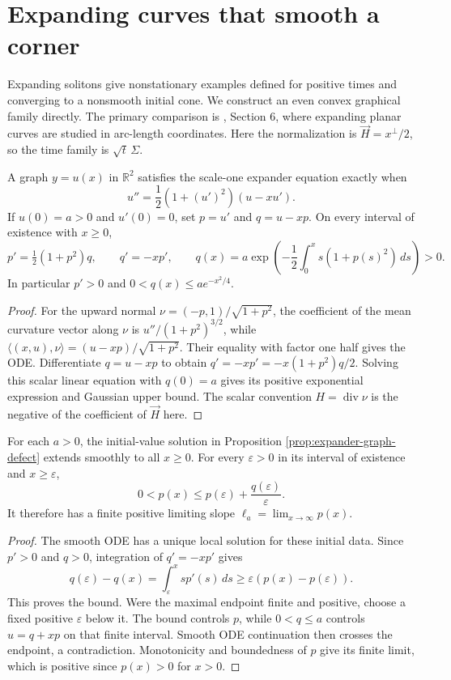 \chapter{Expanding curves that smooth a corner}\label{sec:examples-expanders}
Expanding solitons give nonstationary examples defined for positive times and converging to a nonsmooth initial cone. We construct an even convex graphical family directly. The primary comparison is \cite{Hal12}, Section 6, where expanding planar curves are studied in arc-length coordinates. Here the normalization is $\vec H=x^\perp/2$, so the time family is $\sqrt t\,\Sigma$.

\begin{proposition}\label{prop:expander-graph-defect}
A graph $y=u(x)$ in $\mathbb R^2$ satisfies the scale-one expander equation exactly when
\[
 u''=\frac12(1+(u')^2)(u-xu').
\]
If $u(0)=a>0$ and $u'(0)=0$, set $p=u'$ and $q=u-xp$. On every interval of existence with $x\geq0$,
\[
 p'=\tfrac12(1+p^2)q,\qquad q'=-xp',\qquad
 q(x)=a\exp\left(-\frac12\int_0^x s(1+p(s)^2)\,ds\right)>0.
\]
In particular $p'>0$ and $0<q(x)\leq ae^{-x^2/4}$.
\end{proposition}
\begin{proof}
For the upward normal $\nu=(-p,1)/\sqrt{1+p^2}$, the coefficient of the mean curvature vector along $\nu$ is $u''/(1+p^2)^{3/2}$, while $\langle(x,u),\nu\rangle=(u-xp)/\sqrt{1+p^2}$. Their equality with factor one half gives the ODE. Differentiate $q=u-xp$ to obtain $q'=-xp'=-x(1+p^2)q/2$. Solving this scalar linear equation with $q(0)=a$ gives its positive exponential expression and Gaussian upper bound. The scalar convention $H=\operatorname{div}\nu$ is the negative of the coefficient of $\vec H$ here.
\end{proof}

\begin{lemma}\label{lem:expander-global-slope}
For each $a>0$, the initial-value solution in Proposition \ref{prop:expander-graph-defect} extends smoothly to all $x\geq0$. For every $\varepsilon>0$ in its interval of existence and $x\geq\varepsilon$,
\[
 0<p(x)\leq p(\varepsilon)+\frac{q(\varepsilon)}\varepsilon.
\]
It therefore has a finite positive limiting slope $\ell_a=\lim_{x\to\infty}p(x)$.
\end{lemma}
\begin{proof}
The smooth ODE has a unique local solution for these initial data. Since $p'>0$ and $q>0$, integration of $q'=-xp'$ gives
\[
 q(\varepsilon)-q(x)=\int_\varepsilon^x s p'(s)\,ds
 \geq\varepsilon(p(x)-p(\varepsilon)).
\]
This proves the bound. Were the maximal endpoint finite and positive, choose a fixed positive $\varepsilon$ below it. The bound controls $p$, while $0<q\leq a$ controls $u=q+xp$ on that finite interval. Smooth ODE continuation then crosses the endpoint, a contradiction. Monotonicity and boundedness of $p$ give its finite limit, which is positive since $p(x)>0$ for $x>0$.
\end{proof}

